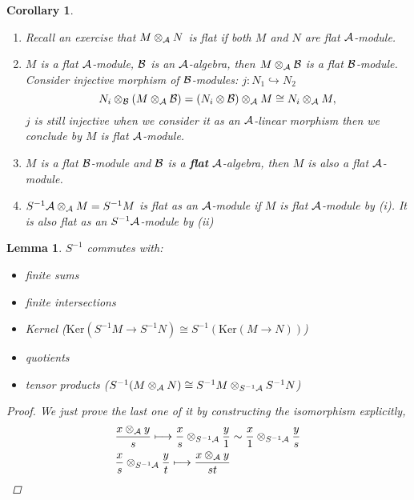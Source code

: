 \documentclass[11pt]{article}
\newtheorem{lemma}[thm]{Lemma}
\newtheorem{cor}[thm]{Corollary}
\newcommand{\cala}{{\cal A}}
\newcommand{\calb}{{\cal B}}
\newcommand{\lrta}{\longrightarrow}
\newcommand{\inj}{\hookrightarrow}
\begin{document}
\begin{cor}\ 
\begin{enumerate}[label=(\roman*)]
    \item
Recall an exercise that $M\otimes_\cala N$ is flat if both $M$ and $N$ are flat $\cala$-module.
\item
$M$ is a flat $\cala$-module, $\calb$ is an $\cala$-algebra, then $M\otimes_\cala\calb$ is a flat $\calb$-module. Consider injective morphism of $\calb$-modules: $j: N_1\inj N_2$
$$
N_i\otimes_\calb (M\otimes_\cala\calb)=(N_i\otimes\calb)\otimes_\cala M\cong N_i\otimes_\cala M,
$$
$j$ is still injective when we consider it as an $\cala$-linear morphism then we conclude by $M$ is flat $\cala$-module.
\item
$M$ is a flat $\calb$-module and $\calb$ is a \textbf{flat} $\cala$-algebra, then $M$ is also a flat $\cala$-module. 
\item
 $S^{-1}\cala\otimes_\cala M=S^{-1}M$ is flat as an $\cala$-module if $M$ is flat $\cala$-module by (i). It is also flat as an $S^{-1}\cala$-module by (ii)
\end{enumerate}
\end{cor}

\begin{lemma}
$S^{-1} $ commutes with:
\begin{itemize}
\item finite sums 
\item finite intersections
\item Kernel ($\text{Ker}(S^{-1}M\lrta S^{-1}N)\cong S^{-1}(\text{Ker}(M\lrta N))$)
\item quotients 
\item tensor products ($S^{-1}(M\otimes_\cala N)\cong S^{-1} M\otimes_{S^{-1}\cala}S^{-1}N$)
\end{itemize} 
\begin{proof}
We just prove the last one of it by constructing the isomorphism explicitly,
$$
\begin{aligned}
&\frac{x\otimes_\cala y}{s}\longmapsto \frac{x}{s}\otimes_{S^{-1}\cala}\frac{y}{1}\sim \frac{x}{1}\otimes_{S^{-1}\cala}\frac{y}{s}\\
&\frac{x}{s}\otimes_{S^{-1}\cala}\frac{y}{t}\longmapsto \frac{x\otimes_\cala y}{s t} 
\end{aligned}
$$
\end{proof}
\end{lemma}
\end{document}
